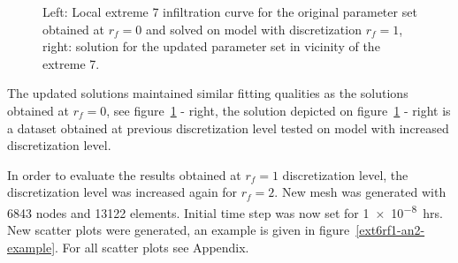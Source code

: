 \documentclass[review]{elsarticle}
\begin{document}
\begin{figure}
\label{rf1examples}
\caption{Left: Local extreme 7 infiltration curve for the original parameter set obtained at $r_f=0$ and solved on model with discretization $r_f=1$, right: solution for the updated parameter set in  vicinity of the extreme 7.}
\end{figure}

The updated solutions maintained similar fitting qualities as the solutions obtained at $r_f=0$, see figure~\ref{rf1examples} - right, the solution depicted on figure~\ref{rf1examples} - right is a dataset obtained at previous discretization level tested on model with increased discretization level.

In order to evaluate the results obtained at $r_f=1$ discretization level, the discretization level was increased again for $r_f=2$. New mesh was generated with 6843 nodes and 13122 elements. Initial time step was now set for \num{1e-8}~hrs. New scatter plots were generated, an example is given in figure~\ref{ext6rf1-an2-example}. For all scatter plots see Appendix.
\end{document}
